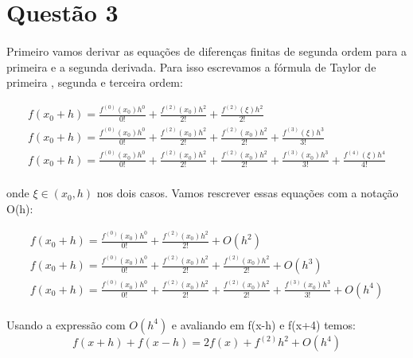 \section*{Questão 3}

\paragraph{}Primeiro vamos derivar as equações de diferenças finitas de segunda ordem 
para a primeira e a segunda derivada. Para isso escrevamos a fórmula de Taylor de primeira 
, segunda e terceira ordem:

\begin{equation}
  \begin{array}{l}
      f(x_0 + h) = \frac{f^{(0)}(x_0)h^0}{0!} + 
          \frac{f^{(2)}(x_0)h^2}{2!} + \frac{f^{(2)}(\xi )h^2}{2!} \\
      f(x_0 + h) = \frac{f^{(0)}(x_0)h^0}{0!} + 
          \frac{f^{(2)}(x_0)h^2}{2!} + \frac{f^{(2)}(x_0)h^2}{2!} 
              + \frac{f^{(3)}(\xi)h^3}{3!}\\
      f(x_0 + h) = \frac{f^{(0)}(x_0)h^0}{0!} + 
          \frac{f^{(2)}(x_0)h^2}{2!} + \frac{f^{(2)}(x_0)h^2}{2!} 
              + \frac{f^{(3)}(x_0)h^3}{3!}
              +  \frac{f^{(4)}(\xi)h^4}{4!}\\

  \end{array}
\end{equation}

onde $\xi \in (x_0, h)$ nos dois casos. Vamos rescrever essas equações com a notação O(h):

\begin{equation}
  \begin{array}{l}
      f(x_0 + h) = \frac{f^{(0)}(x_0)h^0}{0!} + 
          \frac{f^{(2)}(x_0)h^2}{2!} + O(h^2) \\
      f(x_0 + h) = \frac{f^{(0)}(x_0)h^0}{0!} + 
          \frac{f^{(2)}(x_0)h^2}{2!} + \frac{f^{(2)}(x_0)h^2}{2!} 
              + O(h^3)\\
      f(x_0 + h) = \frac{f^{(0)}(x_0)h^0}{0!} + 
          \frac{f^{(2)}(x_0)h^2}{2!} + \frac{f^{(2)}(x_0)h^2}{2!} 
              + \frac{f^{(3)}(x_0)h^3}{3!}
               + O(h^4)\\
  \end{array}
\end{equation}

Usando a expressão com $O(h^4)$ e avaliando em f(x-h) e f(x+4) temos:
\begin{equation}
  f(x+h) + f(x-h) = 2f(x) + f^{(2)}h^2 + O(h^4)
\end{equation}


